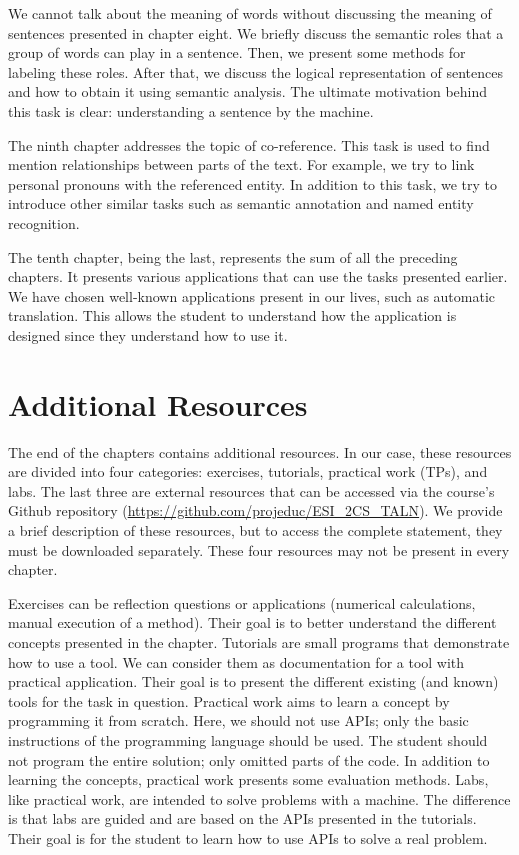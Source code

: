 \documentclass{KodeBook}
\begin{document}
We cannot talk about the meaning of words without discussing the meaning of sentences presented in chapter eight.
We briefly discuss the semantic roles that a group of words can play in a sentence.
Then, we present some methods for labeling these roles.
After that, we discuss the logical representation of sentences and how to obtain it using semantic analysis.
The ultimate motivation behind this task is clear: understanding a sentence by the machine.

The ninth chapter addresses the topic of co-reference.
This task is used to find mention relationships between parts of the text.
For example, we try to link personal pronouns with the referenced entity.
In addition to this task, we try to introduce other similar tasks such as semantic annotation and named entity recognition.

The tenth chapter, being the last, represents the sum of all the preceding chapters.
It presents various applications that can use the tasks presented earlier.
We have chosen well-known applications present in our lives, such as automatic translation.
This allows the student to understand how the application is designed since they understand how to use it.

\section*{Additional Resources}

The end of the chapters contains additional resources.
In our case, these resources are divided into four categories: exercises, tutorials, practical work (TPs), and labs.
The last three are external resources that can be accessed via the course's Github repository (\url{https://github.com/projeduc/ESI_2CS_TALN}).
We provide a brief description of these resources, but to access the complete statement, they must be downloaded separately.
These four resources may not be present in every chapter.

Exercises can be reflection questions or applications (numerical calculations, manual execution of a method).
Their goal is to better understand the different concepts presented in the chapter.
Tutorials are small programs that demonstrate how to use a tool.
We can consider them as documentation for a tool with practical application.
Their goal is to present the different existing (and known) tools for the task in question.
Practical work aims to learn a concept by programming it from scratch.
Here, we should not use APIs; only the basic instructions of the programming language should be used.
The student should not program the entire solution; only omitted parts of the code.
In addition to learning the concepts, practical work presents some evaluation methods.
Labs, like practical work, are intended to solve problems with a machine.
The difference is that labs are guided and are based on the APIs presented in the tutorials.
Their goal is for the student to learn how to use APIs to solve a real problem.

\ifx\wholebook\relax\else
% 
% 
\end{document}
